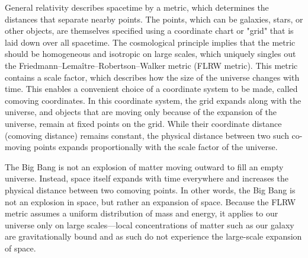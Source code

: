 \documentclass[14pt, oneside]{book}
\begin{document}
			General relativity describes spacetime by a metric, which determines the distances that separate nearby points. The points, which can be galaxies, stars, or other objects, are themselves specified using a coordinate chart or "grid" that is laid down over all spacetime. The cosmological principle implies that the metric should be homogeneous and isotropic on large scales, which uniquely singles out the Friedmann–Lemaître–Robertson–Walker metric (FLRW metric). This metric contains a scale factor, which describes how the size of the universe changes with time. This enables a convenient choice of a coordinate system to be made, called comoving coordinates. In this coordinate system, the grid expands along with the universe, and objects that are moving only because of the expansion of the universe, remain at fixed points on the grid. While their coordinate distance (comoving distance) remains constant, the physical distance between two such co-moving points expands proportionally with the scale factor of the universe.

			The Big Bang is not an explosion of matter moving outward to fill an empty universe. Instead, space itself expands with time everywhere and increases the physical distance between two comoving points. In other words, the Big Bang is not an explosion in space, but rather an expansion of space. Because the FLRW metric assumes a uniform distribution of mass and energy, it applies to our universe only on large scales—local concentrations of matter such as our galaxy are gravitationally bound and as such do not experience the large-scale expansion of space.
\end{document}
